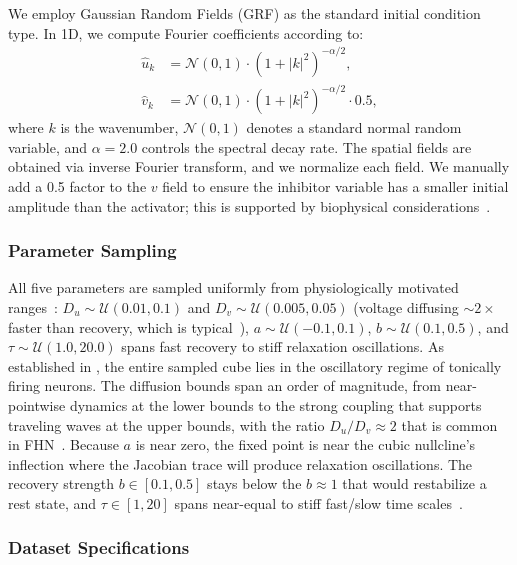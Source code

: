 \documentclass[runningheads]{llncs}
\begin{document}
We employ Gaussian Random Fields (GRF) as the standard initial condition type. In 1D, we compute Fourier coefficients according to:
\begin{align}
    \hat{u}_k &= \mathcal{N}(0,1) \cdot (1 + |k|^2)^{-\alpha/2}, \\
    \hat{v}_k &= \mathcal{N}(0,1) \cdot (1 + |k|^2)^{-\alpha/2} \cdot 0.5,
\end{align}
where $k$ is the wavenumber, $\mathcal{N}(0,1)$ denotes a standard normal random variable, and $\alpha = 2.0$ controls the spectral decay rate. The spatial fields are obtained via inverse Fourier transform, and we normalize each field. We manually add a 0.5 factor to the $v$ field to ensure the inhibitor variable has a smaller initial amplitude than the activator; this is supported by biophysical considerations~\cite{Izhikevich2007}.


\subsubsection{Parameter Sampling}
\label{sec:parameter_sampling}

All five parameters are sampled uniformly from physiologically motivated ranges~\cite{FitzHugh1961,Keener2009,Izhikevich2007}: $D_u \sim \mathcal{U}(0.01, 0.1)$ and $D_v \sim \mathcal{U}(0.005, 0.05)$ (voltage diffusing $\sim2\times$ faster than recovery, which is typical~\cite{Rinzel1998,Ermentrout2010}), $a \sim \mathcal{U}(-0.1, 0.1)$, $b \sim \mathcal{U}(0.1, 0.5)$, and $\tau \sim \mathcal{U}(1.0, 20.0)$ spans fast recovery to stiff relaxation oscillations. As established in , the entire sampled cube lies in the oscillatory regime of tonically firing neurons. The diffusion bounds span an order of magnitude, from near-pointwise dynamics at the lower bounds to the strong coupling that supports traveling waves at the upper bounds, with the ratio $D_u/D_v \approx 2$ that is common in FHN~\cite{Rinzel1998,Ermentrout2010}. Because $a$ is near zero, the fixed point is near the cubic nullcline's inflection where the Jacobian trace will produce relaxation oscillations. The recovery strength $b \in [0.1, 0.5]$ stays below the $b \approx 1$ that would restabilize a rest state, and $\tau \in [1, 20]$ spans near-equal to stiff fast/slow time scales~\cite{Izhikevich2007,Terman1992}.


\subsubsection{Dataset Specifications}
\label{sec:dataset_specs}
\end{document}
